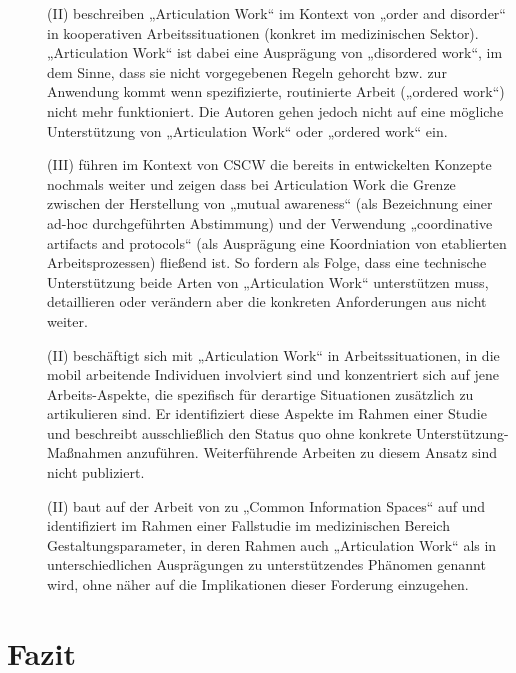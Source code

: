 \begin{description}
	\item[\citet{Berg00}] (II) beschreiben „Articulation Work“ im Kontext von „order and disorder“ in kooperativen Arbeitssituationen (konkret im medizinischen Sektor). „Articulation Work“ ist dabei eine Ausprägung von „disordered work“, im dem Sinne, dass sie nicht vorgegebenen Regeln gehorcht bzw. zur Anwendung kommt wenn spezifizierte, routinierte Arbeit („ordered work“) nicht mehr funktioniert. Die Autoren gehen jedoch nicht auf eine mögliche Unterstützung von „Articulation Work“ oder „ordered work“ ein.
	\item[\citet{Schmidt00}] (III) führen im Kontext von CSCW die bereits in \citep{Schmidt96} entwickelten Konzepte nochmals weiter und zeigen dass bei Articulation Work die Grenze zwischen der Herstellung von „mutual awareness“ (als Bezeichnung einer ad-hoc durchgeführten Abstimmung) und der Verwendung „coordinative artifacts and protocols“ (als Ausprägung eine Koordniation von etablierten Arbeitsprozessen) fließend ist. So fordern als Folge, dass eine technische Unterstützung beide Arten von „Articulation Work“ unterstützen muss, detaillieren oder verändern aber die konkreten Anforderungen aus \citep{Schmidt96} nicht weiter.
	\item[\citet{Christensen01}] (II) beschäftigt sich mit „Articulation Work“ in Arbeitssituationen, in die mobil arbeitende Individuen involviert sind und konzentriert sich auf jene Arbeits-Aspekte, die spezifisch für derartige Situationen zusätzlich zu artikulieren sind. Er identifiziert diese Aspekte im Rahmen einer Studie und beschreibt ausschließlich den Status quo ohne konkrete Unterstützung-Maßnahmen anzuführen. Weiterführende Arbeiten zu diesem Ansatz sind nicht publiziert.
	\item[\citet{Bossen02}] (II) baut auf der Arbeit von \citep{Bannon97} zu „Common Information Spaces“ auf und identifiziert im Rahmen einer Fallstudie im medizinischen Bereich Gestaltungsparameter, in deren Rahmen auch „Articulation Work“ als in unterschiedlichen Ausprägungen zu unterstützendes Phänomen genannt wird, ohne näher auf die Implikationen dieser Forderung einzugehen.
\end{description}


\section{Fazit} %
\label{sec:fazit}

